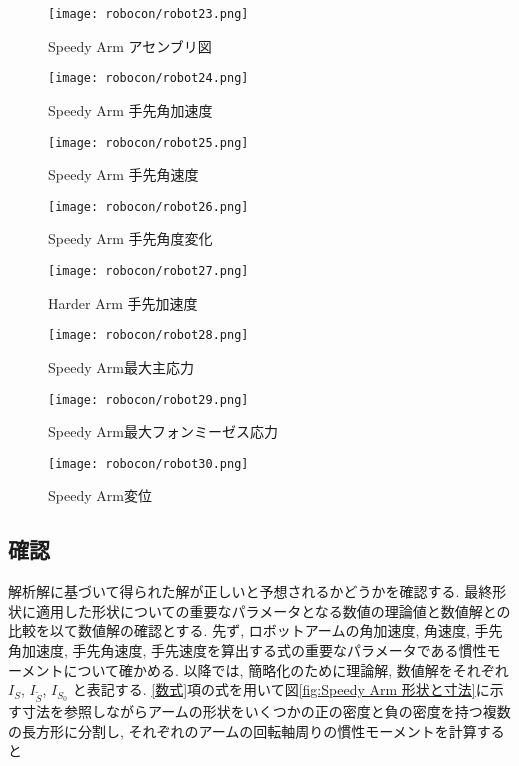 \documentclass[10pt,b5paper,papersize,dvipdfmx]{jsbook}
\begin{document}
\begin{figure}[H]
  \centering
  \texttt{[image: robocon/robot23.png]}
  \caption{Speedy Arm アセンブリ図}
  \label{fig:Speedy Arm アセンブリ図}
\end{figure}
\begin{figure}[H]
  \centering
  \texttt{[image: robocon/robot24.png]}
  \caption{Speedy Arm 手先角加速度}
  \label{fig:Speedy Arm 手先角加速度}
\end{figure}
\begin{figure}[H]
  \centering
  \texttt{[image: robocon/robot25.png]}
  \caption{Speedy Arm 手先角速度}
  \label{fig:Speedy Arm 手先角速度}
\end{figure}
\begin{figure}[H]
  \centering
  \texttt{[image: robocon/robot26.png]}
  \caption{Speedy Arm 手先角度変化}
  \label{fig:Speedy Arm 手先角度変化}
\end{figure}
\begin{figure}[H]
  \centering
  \texttt{[image: robocon/robot27.png]}
  \caption{Harder Arm 手先加速度}
  \label{fig:Harder Arm 手先加速度}
\end{figure}
\begin{figure}[H]
  \centering
  \texttt{[image: robocon/robot28.png]}
  \caption{Speedy Arm最大主応力}
  \label{fig:Speedy Arm最大主応力}
\end{figure}
\begin{figure}[H]
  \centering
  \texttt{[image: robocon/robot29.png]}
  \caption{Speedy Arm最大フォンミーゼス応力}
  \label{fig:Speedy Arm最大フォンミーゼス応力}
\end{figure}
\begin{figure}[H]
  \centering
  \texttt{[image: robocon/robot30.png]}
  \caption{Speedy Arm変位}
  \label{fig:Speedy Arm変位}
\end{figure}
\subsection{確認}
解析解に基づいて得られた解が正しいと予想されるかどうかを確認する. 最終形状に適用した形状についての重要なパラメータとなる数値の理論値と数値解との比較を以て数値解の確認とする. 先ず, ロボットアームの角加速度, 角速度, 手先角加速度, 手先角速度, 手先速度を算出する式の重要なパラメータである慣性モーメントについて確かめる. 以降では, 簡略化のために理論解, 数値解をそれぞれ $I_S$, $I_{\tilde{S}}$, $I_{S_0}$ と表記する. \ref{数式}項の式を用いて図\ref{fig:Speedy Arm 形状と寸法}に示す寸法を参照しながらアームの形状をいくつかの正の密度と負の密度を持つ複数の長方形に分割し, それぞれのアームの回転軸周りの慣性モーメントを計算すると
\end{document}
